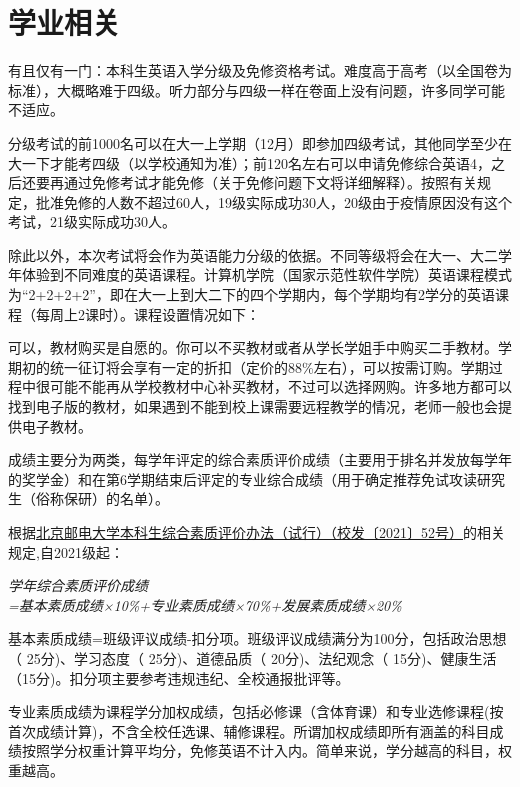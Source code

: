 \section{学业相关}


有且仅有一门：本科生英语入学分级及免修资格考试。难度高于高考（以全国卷为标准），大概略难于四级。听力部分与四级一样在卷面上没有问题，许多同学可能不适应。

分级考试的前1000名可以在大一上学期（12月）即参加四级考试，其他同学至少在大一下才能考四级（以学校通知为准）；前120名左右可以申请免修综合英语4，之后还要再通过免修考试才能免修（关于免修问题下文将详细解释）。按照有关规定，批准免修的人数不超过60人，19级实际成功30人，20级由于疫情原因没有这个考试，21级实际成功30人。

除此以外，本次考试将会作为英语能力分级的依据。不同等级将会在大一、大二学年体验到不同难度的英语课程。计算机学院（国家示范性软件学院）英语课程模式为“2+2+2+2”，即在大一上到大二下的四个学期内，每个学期均有2学分的英语课程（每周上2课时）。课程设置情况如下：



可以，教材购买是自愿的。你可以不买教材或者从学长学姐手中购买二手教材。学期初的统一征订将会享有一定的折扣（定价的88\%左右），可以按需订购。学期过程中很可能不能再从学校教材中心补买教材，不过可以选择网购。许多地方都可以找到电子版的教材，如果遇到不能到校上课需要远程教学的情况，老师一般也会提供电子教材。


成绩主要分为两类，每学年评定的综合素质评价成绩（主要用于排名并发放每学年的奖学金）和在第6学期结束后评定的专业综合成绩（用于确定推荐免试攻读研究生（俗称保研）的名单）。

根据\href{http://my.bupt.edu.cn/content.jsp?urltype=news.NewsContentUrl&wbtreeid=1025&wbnewsid=95500}{北京邮电大学本科生综合素质评价办法（试行）（校发〔2021〕52号）}的相关规定,自2021级起：
\begin{center}
    \emph{学年综合素质评价成绩\\=基本素质成绩×10\%+专业素质成绩×70\%+发展素质成绩×20\%}
\end{center}

基本素质成绩=班级评议成绩-扣分项。班级评议成绩满分为100分，包括政治思想（ 25分)、学习态度（ 25分)、道德品质（ 20分)、法纪观念（ 15分)、健康生活（15分)。扣分项主要参考违规违纪、全校通报批评等。

专业素质成绩为课程学分加权成绩，包括必修课（含体育课）和专业选修课程(按首次成绩计算)，不含全校任选课、辅修课程。所谓加权成绩即所有涵盖的科目成绩按照学分权重计算平均分，免修英语不计入内。简单来说，学分越高的科目，权重越高。


